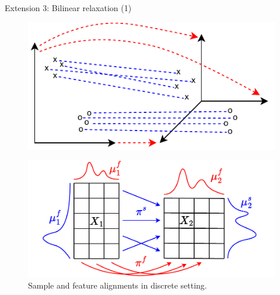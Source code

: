 \documentclass{beamer}
\begin{document}
\begin{frame}{Extension 3: Bilinear relaxation (1)}
  \begin{figure}
    \centering
    \includegraphics[width=0.7\linewidth, keepaspectratio=true]{OT_new/coot_new.pdf}
  \end{figure}

  \begin{figure}
    \centering
    \includegraphics[width=0.7\linewidth, keepaspectratio=true]{OT_new/coot_matrix_ot.pdf}
    \caption*{\scriptsize{Sample and feature alignments in discrete setting.}}
  \end{figure}

\end{frame}
\end{document}
